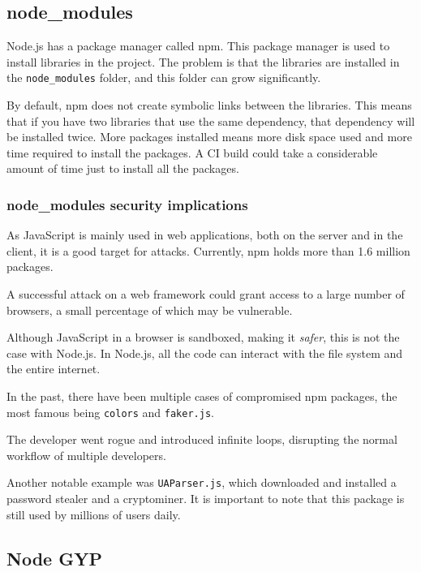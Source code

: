 \documentclass[10pt,journal,compsoc]{IEEEtran}
\begin{document}
\subsection{node\_modules}

Node.js has a package manager called npm. This package manager is used to install libraries in the project. The problem is that the libraries are installed in the \verb|node_modules| folder, and this folder can grow significantly. \cite{BADNPM}

By default, npm does not create symbolic links between the libraries. This means that if you have two libraries that use the same dependency, that dependency will be installed twice. More packages installed means more disk space used and more time required to install the packages. A CI build could take a considerable amount of time just to install all the packages.

\subsubsection{node\_modules security implications}

As JavaScript is mainly used in web applications, both on the server and in the client, it is a good target for attacks. Currently, npm holds more than 1.6 million packages. \cite{NPMCOUNT}

A successful attack on a web framework could grant access to a large number of browsers, a small percentage of which may be vulnerable.

Although JavaScript in a browser is sandboxed, making it \textit{safer}, this is not the case with Node.js. In Node.js, all the code can interact with the file system and the entire internet.

In the past, there have been multiple cases of compromised npm packages, the most famous being \verb|colors| and \verb|faker.js|. \cite{BADFAKER} \cite{VERGEFAKER}

The developer went rogue and introduced infinite loops, disrupting the normal workflow of multiple developers.

Another notable example was \verb|UAParser.js|, which downloaded and installed a password stealer and a cryptominer. It is important to note that this package is still used by millions of users daily.


\subsection{Node GYP}
\end{document}
